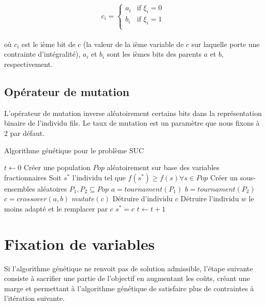 \begin{equation}
  c_i =
    \begin{cases}
      a_i & \text{if } \xi_i = 0 \\
      b_i & \text{if } \xi_i = 1 \\
    \end{cases}       
\end{equation} \\

où $c_i$ est le ième bit de $c$ (la valeur de la ième variable de $c$ sur laquelle porte une
contrainte d'intégralité),
$a_i$ et $b_i$ sont les ièmes bits des parents $a$ et $b$, respectivement.

\subsection{Opérateur de mutation}

L'opérateur de mutation inverse aléatoirement certains bits dans la représentation binaire
de l'individu fils. Le taux de mutation est un paramètre que nous fixons à 2 par défaut.

\begin{algorithm}[H]
\caption{Algorithme génétique pour le problème SUC}
\begin{algorithmic}[1]
\State $t \leftarrow 0$
\State Créer une population $Pop$ aléatoirement sur base des variables fractionnaires
\State Soit $s^{*}$ l'individu tel que $f(s^{*}) \ge f(s) \forall s \in Pop$
\State Créer un sous-ensembles aléatoires $P_1, P_2 \subseteq Pop$
\State $a = tournament(P_1)$
\State $b = tournament(P_2)$
\State $c = crossover(a, b)$
\State $mutate(c)$
\State Détruire d'individu $c$
\Else
\State Détruire l'individu $w$ le moins adapté et le remplacer par $c$
\EndIf
{}
\State $s^{*} = c$
\EndIf
\State $t \leftarrow t + 1$
\EndWhile
\EndProcedure
\end{algorithmic}
\end{algorithm}

\section{Fixation de variables}

Si l'algorithme génétique ne renvoit pas de solution admissible, l'étape suivante consiste
à sacrifier une partie de l'objectif en augmentant les coûts, créant une marge et permettant
à l'algorithme génétique de satisfaire plus de contraintes à l'itération suivante.

